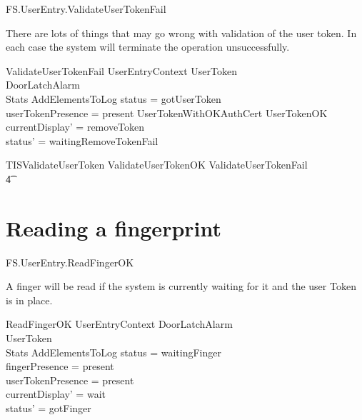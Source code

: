\begin{traceunit}{FS.UserEntry.ValidateUserTokenFail}
\end{traceunit}



There are lots of things that may go wrong with validation of the user
token. In each case the system will terminate the operation unsuccessfully.

\begin{schema}{ValidateUserTokenFail}
        UserEntryContext
\also
        \Xi UserToken
\\      \Xi DoorLatchAlarm
\\      \Xi Stats       
\also
        AddElementsToLog
\where
        status = gotUserToken
\\      userTokenPresence = present
\also
        \lnot UserTokenWithOKAuthCert \land \lnot UserTokenOK 
\also
        currentDisplay' = removeToken
\\      status' = waitingRemoveTokenFail
\end{schema}

\begin{zed}
        TISValidateUserToken  ValidateUserTokenOK \lor
        ValidateUserTokenFail 
\\ \t4 \lor
        [~UserTokenTorn | status = gotUserToken ]
\end{zed}

\section{Reading a fingerprint}

\begin{traceunit}{FS.UserEntry.ReadFingerOK}
\end{traceunit}

A finger will be read if the system is currently waiting for it and
the user Token is in place.

\begin{schema}{ReadFingerOK}
        UserEntryContext
\also
        \Xi DoorLatchAlarm
\\	\Xi UserToken
\\      \Xi Stats
\also
        AddElementsToLog
\where
	status = waitingFinger
\\	fingerPresence = present
\\      userTokenPresence = present
\also
\\	currentDisplay' = wait
\\	status' = gotFinger
\end{schema}

